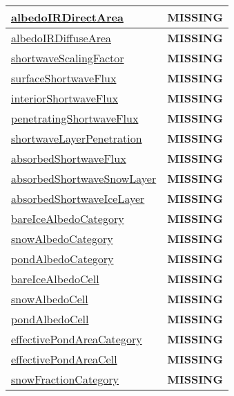 {\begin{center}
\begin{longtable}{| p{2.0in} | p{4.0in} |}
    \hline
    \hyperref[subsec:var_sec_shortwave_albedoIRDirectArea]{albedoIRDirectArea} & {\bf \color{red} MISSING} \\
    \hline
    \hyperref[subsec:var_sec_shortwave_albedoIRDiffuseArea]{albedoIRDiffuseArea} & {\bf \color{red} MISSING} \\
    \hline
    \hyperref[subsec:var_sec_shortwave_shortwaveScalingFactor]{shortwaveScalingFactor} & {\bf \color{red} MISSING} \\
    \hline
    \hyperref[subsec:var_sec_shortwave_surfaceShortwaveFlux]{surfaceShortwaveFlux} & {\bf \color{red} MISSING} \\
    \hline
    \hyperref[subsec:var_sec_shortwave_interiorShortwaveFlux]{interiorShortwaveFlux} & {\bf \color{red} MISSING} \\
    \hline
    \hyperref[subsec:var_sec_shortwave_penetratingShortwaveFlux]{penetratingShortwaveFlux} & {\bf \color{red} MISSING} \\
    \hline
    \hyperref[subsec:var_sec_shortwave_shortwaveLayerPenetration]{shortwaveLayerPenetration} & {\bf \color{red} MISSING} \\
    \hline
    \hyperref[subsec:var_sec_shortwave_absorbedShortwaveFlux]{absorbedShortwaveFlux} & {\bf \color{red} MISSING} \\
    \hline
    \hyperref[subsec:var_sec_shortwave_absorbedShortwaveSnowLayer]{absorbedShortwaveSnowLayer} & {\bf \color{red} MISSING} \\
    \hline
    \hyperref[subsec:var_sec_shortwave_absorbedShortwaveIceLayer]{absorbedShortwaveIceLayer} & {\bf \color{red} MISSING} \\
    \hline
    \hyperref[subsec:var_sec_shortwave_bareIceAlbedoCategory]{bareIceAlbedoCategory} & {\bf \color{red} MISSING} \\
    \hline
    \hyperref[subsec:var_sec_shortwave_snowAlbedoCategory]{snowAlbedoCategory} & {\bf \color{red} MISSING} \\
    \hline
    \hyperref[subsec:var_sec_shortwave_pondAlbedoCategory]{pondAlbedoCategory} & {\bf \color{red} MISSING} \\
    \hline
    \hyperref[subsec:var_sec_shortwave_bareIceAlbedoCell]{bareIceAlbedoCell} & {\bf \color{red} MISSING} \\
    \hline
    \hyperref[subsec:var_sec_shortwave_snowAlbedoCell]{snowAlbedoCell} & {\bf \color{red} MISSING} \\
    \hline
    \hyperref[subsec:var_sec_shortwave_pondAlbedoCell]{pondAlbedoCell} & {\bf \color{red} MISSING} \\
    \hline
    \hyperref[subsec:var_sec_shortwave_effectivePondAreaCategory]{effectivePondAreaCategory} & {\bf \color{red} MISSING} \\
    \hline
    \hyperref[subsec:var_sec_shortwave_effectivePondAreaCell]{effectivePondAreaCell} & {\bf \color{red} MISSING} \\
    \hline
    \hyperref[subsec:var_sec_shortwave_snowFractionCategory]{snowFractionCategory} & {\bf \color{red} MISSING} \\
    \hline
\end{longtable}
\end{center}
}
